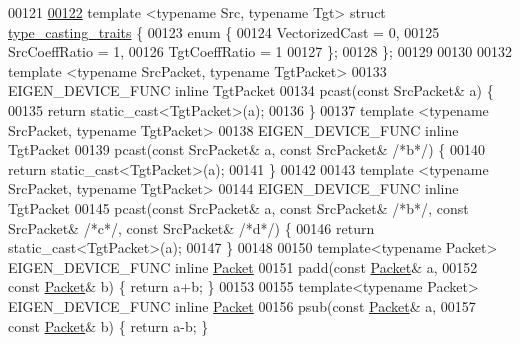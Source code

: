 \begin{DoxyCode}
00121 
\hyperlink{struct_eigen_1_1internal_1_1type__casting__traits}{00122} \textcolor{keyword}{template} <\textcolor{keyword}{typename} Src, \textcolor{keyword}{typename} Tgt> \textcolor{keyword}{struct }\hyperlink{struct_eigen_1_1internal_1_1type__casting__traits}{type\_casting\_traits} \{
00123   \textcolor{keyword}{enum} \{
00124     VectorizedCast = 0,
00125     SrcCoeffRatio = 1,
00126     TgtCoeffRatio = 1
00127   \};
00128 \};
00129 
00130 
00132 \textcolor{keyword}{template} <\textcolor{keyword}{typename} SrcPacket, \textcolor{keyword}{typename} TgtPacket>
00133 EIGEN\_DEVICE\_FUNC \textcolor{keyword}{inline} TgtPacket
00134 pcast(\textcolor{keyword}{const} SrcPacket& a) \{
00135   \textcolor{keywordflow}{return} \textcolor{keyword}{static\_cast<}TgtPacket\textcolor{keyword}{>}(a);
00136 \}
00137 \textcolor{keyword}{template} <\textcolor{keyword}{typename} SrcPacket, \textcolor{keyword}{typename} TgtPacket>
00138 EIGEN\_DEVICE\_FUNC \textcolor{keyword}{inline} TgtPacket
00139 pcast(\textcolor{keyword}{const} SrcPacket& a, \textcolor{keyword}{const} SrcPacket& \textcolor{comment}{/*b*/}) \{
00140   \textcolor{keywordflow}{return} \textcolor{keyword}{static\_cast<}TgtPacket\textcolor{keyword}{>}(a);
00141 \}
00142 
00143 \textcolor{keyword}{template} <\textcolor{keyword}{typename} SrcPacket, \textcolor{keyword}{typename} TgtPacket>
00144 EIGEN\_DEVICE\_FUNC \textcolor{keyword}{inline} TgtPacket
00145 pcast(\textcolor{keyword}{const} SrcPacket& a, \textcolor{keyword}{const} SrcPacket& \textcolor{comment}{/*b*/}, \textcolor{keyword}{const} SrcPacket& \textcolor{comment}{/*c*/}, \textcolor{keyword}{const} SrcPacket& \textcolor{comment}{/*d*/}) \{
00146   \textcolor{keywordflow}{return} \textcolor{keyword}{static\_cast<}TgtPacket\textcolor{keyword}{>}(a);
00147 \}
00148 
00150 \textcolor{keyword}{template}<\textcolor{keyword}{typename} Packet> EIGEN\_DEVICE\_FUNC \textcolor{keyword}{inline} \hyperlink{union_eigen_1_1internal_1_1_packet}{Packet}
00151 padd(\textcolor{keyword}{const} \hyperlink{union_eigen_1_1internal_1_1_packet}{Packet}& a,
00152         \textcolor{keyword}{const} \hyperlink{union_eigen_1_1internal_1_1_packet}{Packet}& b) \{ \textcolor{keywordflow}{return} a+b; \}
00153 
00155 \textcolor{keyword}{template}<\textcolor{keyword}{typename} Packet> EIGEN\_DEVICE\_FUNC \textcolor{keyword}{inline} \hyperlink{union_eigen_1_1internal_1_1_packet}{Packet}
00156 psub(\textcolor{keyword}{const} \hyperlink{union_eigen_1_1internal_1_1_packet}{Packet}& a,
00157         \textcolor{keyword}{const} \hyperlink{union_eigen_1_1internal_1_1_packet}{Packet}& b) \{ \textcolor{keywordflow}{return} a-b; \}

\end{DoxyCode}
